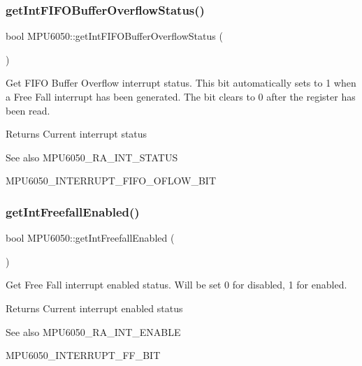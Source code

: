 \subsubsection{\texorpdfstring{getIntFIFOBufferOverflowStatus()}{getIntFIFOBufferOverflowStatus()}}
{\footnotesize\ttfamily bool M\+P\+U6050\+::get\+Int\+F\+I\+F\+O\+Buffer\+Overflow\+Status (\begin{DoxyParamCaption}{ }\end{DoxyParamCaption})}

Get F\+I\+FO Buffer Overflow interrupt status. This bit automatically sets to 1 when a Free Fall interrupt has been generated. The bit clears to 0 after the register has been read. \begin{DoxyReturn}{Returns}
Current interrupt status 
\end{DoxyReturn}
\begin{DoxySeeAlso}{See also}
M\+P\+U6050\+\_\+\+R\+A\+\_\+\+I\+N\+T\+\_\+\+S\+T\+A\+T\+US 

M\+P\+U6050\+\_\+\+I\+N\+T\+E\+R\+R\+U\+P\+T\+\_\+\+F\+I\+F\+O\+\_\+\+O\+F\+L\+O\+W\+\_\+\+B\+IT 
\end{DoxySeeAlso}
\mbox{\label{class_m_p_u6050_a500bb2df2e46eaecd3fb2ba7304a5ed3}} 
\subsubsection{\texorpdfstring{getIntFreefallEnabled()}{getIntFreefallEnabled()}}
{\footnotesize\ttfamily bool M\+P\+U6050\+::get\+Int\+Freefall\+Enabled (\begin{DoxyParamCaption}{ }\end{DoxyParamCaption})}

Get Free Fall interrupt enabled status. Will be set 0 for disabled, 1 for enabled. \begin{DoxyReturn}{Returns}
Current interrupt enabled status 
\end{DoxyReturn}
\begin{DoxySeeAlso}{See also}
M\+P\+U6050\+\_\+\+R\+A\+\_\+\+I\+N\+T\+\_\+\+E\+N\+A\+B\+LE 

M\+P\+U6050\+\_\+\+I\+N\+T\+E\+R\+R\+U\+P\+T\+\_\+\+F\+F\+\_\+\+B\+IT 
\end{DoxySeeAlso}
\mbox{\label{class_m_p_u6050_a06bbc2116235b7cc5e28c877e0576749}} 
